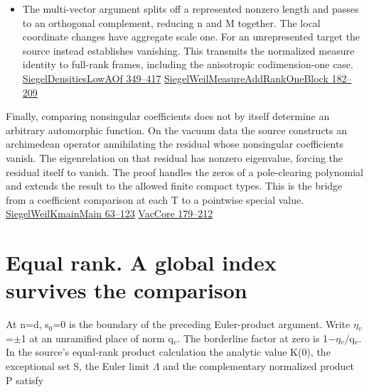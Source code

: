 \documentclass[11pt,letterpaper]{article}
\begin{document}
\begin{itemize}
\item 
The multi-vector argument splits off a represented nonzero length and passes to an orthogonal complement, reducing n and M together. The local coordinate changes have aggregate scale one. For an unrepresented target the source instead establishes vanishing. This transmits the normalized measure identity to full-rank frames, including the anisotropic codimension-one case. \href{https://github.com/nousentllc/riemann-hypothesis/blob/40e56bab026552e089d7afcfeff08d2defb9c005/src/Development/WeilBound/CoreStatements/AutomorphicKernels/UnitarySchrodingerModel/UnitarySchrodingerLemmas/LowRankSiegelDensities/SiegelDensitiesLowAOf.lean\#L349-L417}{SiegelDensitiesLowAOf 349–417} \href{https://github.com/nousentllc/riemann-hypothesis/blob/40e56bab026552e089d7afcfeff08d2defb9c005/src/CompanionTheory/SpectralGeometry/LocalGlobalProofs/AdelicAnalysis/SiegelWeilMeasureAddRankOneBlock.lean\#L182-L209}{SiegelWeilMeasureAddRankOneBlock 182–209}

\end{itemize}
Finally, comparing nonsingular coefficients does not by itself determine an arbitrary automorphic function. On the vacuum data the source constructs an archimedean operator annihilating the residual whose nonsingular coefficients vanish. The eigenrelation on that residual has nonzero eigenvalue, forcing the residual itself to vanish. The proof handles the zeros of a pole-clearing polynomial and extends the result to the allowed finite compact types. This is the bridge from a coefficient comparison at each T to a pointwise special value. \href{https://github.com/nousentllc/riemann-hypothesis/blob/40e56bab026552e089d7afcfeff08d2defb9c005/src/Development/AutomorphicArithmetic/Foundations/GaloisRepresentations/ThetaParseval/ThetaKernels/SiegelWeilKmainMain.lean\#L63-L123}{SiegelWeilKmainMain 63–123} \href{https://github.com/nousentllc/riemann-hypothesis/blob/40e56bab026552e089d7afcfeff08d2defb9c005/src/Development/WeilBound/RepresentationTheoryGL/SiegelWeilProof/HolomorphicContinuation/AbsoluteConvergence/VacCore.lean\#L179-L212}{VacCore 179–212}

\section{Equal rank. A global index survives the comparison}
At n=d, s\ensuremath{{}_{0}}=0 is the boundary of the preceding Euler-product argument. Write \ensuremath{\eta}\ensuremath{{}_{v}}=\ensuremath{\pm}1 at an unramified place of norm q\ensuremath{{}_{v}}. The borderline factor at zero is 1\ensuremath{-}\ensuremath{\eta}\ensuremath{{}_{v}}/q\ensuremath{{}_{v}}. In the source’s equal-rank product calculation the analytic value K(0), the exceptional set S, the Euler limit \ensuremath{\Lambda} and the complementary normalized product P satisfy
\end{document}
